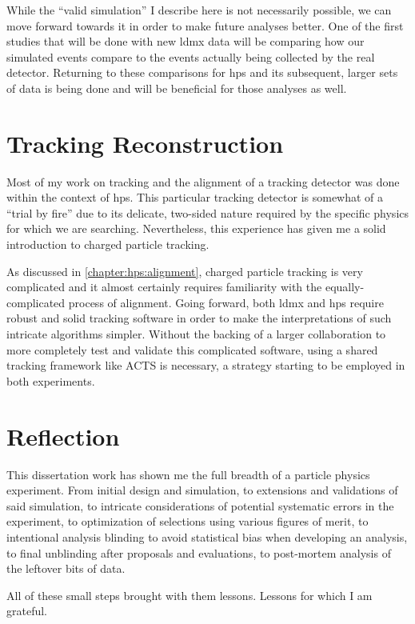 While the ``valid simulation'' I describe here is not necessarily possible,
we can move forward towards it in order to make future analyses better.
One of the first studies that will be done with new \ac{ldmx} data will
be comparing how our simulated events compare to the events actually being
collected by the real detector.
Returning to these comparisons for \ac{hps} and its subsequent, larger
sets of data is being done and will be beneficial for those analyses as well.

\section{Tracking Reconstruction}
Most of my work on tracking and the alignment of a tracking detector
was done within the context of \ac{hps}.
This particular tracking detector is somewhat of a ``trial by fire'' due
to its delicate, two-sided nature required by the specific physics for
which we are searching.
Nevertheless, this experience has given me a solid introduction to charged
particle tracking.

As discussed in \cref{chapter:hps:alignment}, charged particle tracking is
very complicated and it almost certainly requires familiarity with the
equally-complicated process of alignment.
Going forward, both \ac{ldmx} and \ac{hps} require robust and solid tracking
software in order to make the interpretations of such intricate algorithms simpler.
Without the backing of a larger collaboration to more completely test
and validate this complicated software, using a shared tracking framework
like ACTS\cite{acts} is necessary, a strategy starting to be employed in both
experiments.

\section{Reflection}
This dissertation work has shown me the full breadth of a particle physics experiment.
From initial design and simulation, to extensions and validations of said simulation,
to intricate considerations of potential systematic errors in the experiment,
to optimization of selections using various figures of merit,
to intentional analysis blinding to avoid statistical bias when developing an analysis,
to final unblinding after proposals and evaluations,
to post-mortem analysis of the leftover bits of data.

All of these small steps brought with them lessons.
Lessons for which I am grateful.
